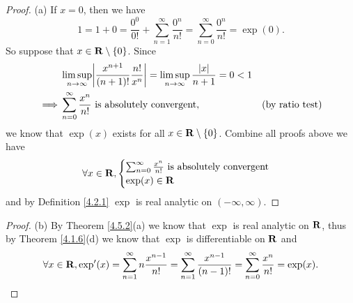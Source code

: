 \begin{proof}{(a)}
    If \(x = 0\), then we have
    \[
        1 = 1 + 0 = \frac{0^0}{0!} + \sum_{n = 1}^\infty \frac{0^n}{n!} = \sum_{n = 0}^\infty \frac{0^n}{n!} = \exp(0).
    \]
    So suppose that \(x \in \mathbf{R} \setminus \{0\}\).
    Since
    \begin{align*}
                 & \limsup_{n \to \infty} \abs{\frac{x^{n + 1}}{(n + 1)!} \frac{n!}{x^n}} = \limsup_{n \to \infty} \frac{\abs{x}}{n + 1} = 0 < 1                          \\
        \implies & \sum_{n = 0}^\infty \frac{x^n}{n!} \text{ is absolutely convergent},                                                          & \text{(by ratio test)}
    \end{align*}
    we know that \(\exp(x)\) exists for all \(x \in \mathbf{R} \setminus \{0\}\).
    Combine all proofs above we have
    \[
        \forall x \in \mathbf{R}, \begin{cases}
            \sum_{n = 0}^\infty \frac{x^n}{n!} \text{ is absolutely convergent} \\
            \exp(x) \in \mathbf{R}
        \end{cases}
    \]
    and by Definition \ref{4.2.1} \(\exp\) is real analytic on \((-\infty, \infty)\).
\end{proof}

\begin{proof}{(b)}
    By Theorem \ref{4.5.2}(a) we know that \(\exp\) is real analytic on \(\mathbf{R}\), thus by Theorem \ref{4.1.6}(d) we know that \(\exp\) is differentiable on \(\mathbf{R}\) and
    \[
        \forall x \in \mathbf{R}, \exp'(x) = \sum_{n = 1}^\infty n \frac{x^{n - 1}}{n!} = \sum_{n = 1}^\infty \frac{x^{n - 1}}{(n - 1)!} = \sum_{n = 0}^\infty \frac{x^n}{n!} = \exp(x).
    \]
\end{proof}

